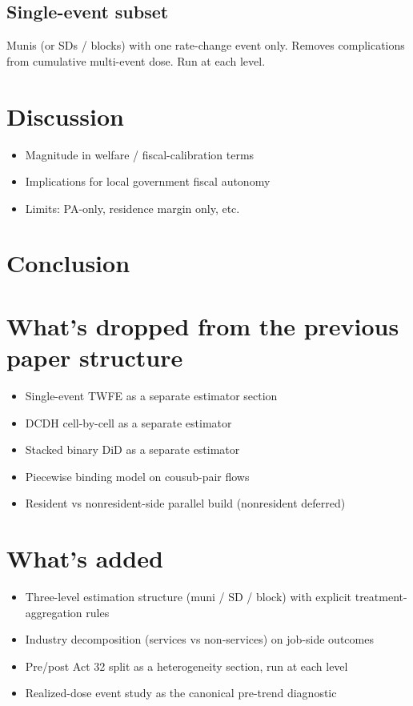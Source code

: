 \documentclass{article}
\begin{document}
\subsection{Single-event subset}
Munis (or SDs / blocks) with one rate-change event only. Removes
complications from cumulative multi-event dose. Run at each level.

\section{Discussion}
\begin{itemize}
  \item Magnitude in welfare / fiscal-calibration terms
  \item Implications for local government fiscal autonomy
  \item Limits: PA-only, residence margin only, etc.
\end{itemize}

\section{Conclusion}

\section*{What's dropped from the previous paper structure}
\begin{itemize}
  \item Single-event TWFE as a separate estimator section
  \item DCDH cell-by-cell as a separate estimator
  \item Stacked binary DiD as a separate estimator
  \item Piecewise binding model on cousub-pair flows
  \item Resident vs nonresident-side parallel build (nonresident deferred)
\end{itemize}

\section*{What's added}
\begin{itemize}
  \item Three-level estimation structure (muni / SD / block) with
    explicit treatment-aggregation rules
  \item Industry decomposition (services vs non-services) on job-side
    outcomes
  \item Pre/post Act 32 split as a heterogeneity section, run at each level
  \item Realized-dose event study as the canonical pre-trend diagnostic
\end{itemize}
\end{document}
